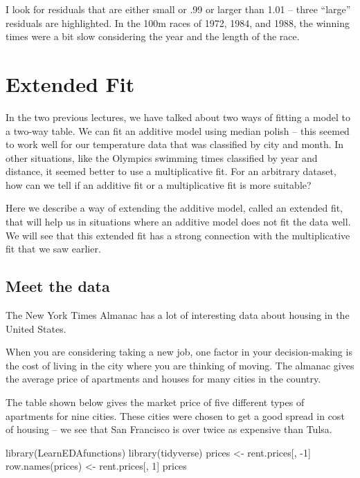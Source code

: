 \documentclass[
]{book}
\newenvironment{Shaded}{\begin{snugshade}}{\end{snugshade}}
\newcommand{\DecValTok}[1]{\textcolor[rgb]{0.00,0.00,0.81}{#1}}
\newcommand{\FunctionTok}[1]{\textcolor[rgb]{0.00,0.00,0.00}{#1}}
\newcommand{\NormalTok}[1]{#1}
\newcommand{\OtherTok}[1]{\textcolor[rgb]{0.56,0.35,0.01}{#1}}
\newcommand{\SpecialCharTok}[1]{\textcolor[rgb]{0.00,0.00,0.00}{#1}}
\begin{document}
I look for residuals that are either small or .99 or larger than 1.01 -- three ``large'' residuals are highlighted. In the 100m races of 1972, 1984, and 1988, the winning times were a bit slow considering the year and the length of the race.

\hypertarget{extended-fit}{%
\chapter{Extended Fit}\label{extended-fit}}

In the two previous lectures, we have talked about two ways of fitting a model to a two-way table. We can fit an additive model using median polish -- this seemed to work well for our temperature data that was classified by city and month. In other situations, like the Olympics swimming times classified by year and distance, it seemed better to use a multiplicative fit. For an arbitrary dataset, how can we tell if an additive fit or a multiplicative fit is more suitable?

Here we describe a way of extending the additive model, called an extended fit, that will help us in situations where an additive model does not fit the data well. We will see that this extended fit has a strong connection with the multiplicative fit that we saw earlier.

\hypertarget{meet-the-data-8}{%
\section{Meet the data}\label{meet-the-data-8}}

The New York Times Almanac has a lot of interesting data about housing in the United States.

When you are considering taking a new job, one factor in your decision-making is the cost of living in the city where you are thinking of moving. The almanac gives the average price of apartments and houses for many cities in the country.

The table shown below gives the market price of five different types of apartments for nine cities. These cities were chosen to get a good spread in cost of housing -- we see that San Francisco is over twice as expensive than Tulsa.

\begin{Shaded}
\begin{Highlighting}[]
\FunctionTok{library}\NormalTok{(LearnEDAfunctions)}
\FunctionTok{library}\NormalTok{(tidyverse)}
\NormalTok{prices }\OtherTok{\textless{}{-}}\NormalTok{ rent.prices[, }\SpecialCharTok{{-}}\DecValTok{1}\NormalTok{]}
\FunctionTok{row.names}\NormalTok{(prices) }\OtherTok{\textless{}{-}}\NormalTok{ rent.prices[, }\DecValTok{1}\NormalTok{]}
\NormalTok{prices}
\end{Highlighting}
\end{Shaded}
\end{document}
